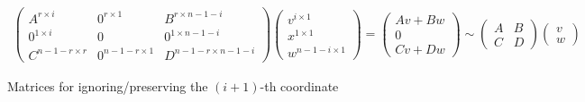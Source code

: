 \begin{figure}[h]
    \begin{align*}
        \left(\begin{matrix}
            A^{r     \times i} & 0^{r     \times 1} & B^{r     \times n-1-i} \\
            0^{1     \times i} & 0                  & 0^{1     \times n-1-i} \\
            C^{n-1-r \times r} & 0^{n-1-r \times 1} & D^{n-1-r \times n-1-i}         
        \end{matrix}\right)
        \left( \begin{matrix}
            v^{i     \times 1} \\
            x^{1     \times 1}\\
            w^{n-1-i \times 1}
        \end{matrix}\right)    = 
        \left( \begin{matrix}
            Av + Bw \\
            0\\
            Cv + Dw
        \end{matrix}\right)    \sim
        \left(\begin{matrix}
            A & B \\
            C & D
        \end{matrix}\right)
        \left(\begin{matrix}
            v \\
            w
        \end{matrix}\right)
    \end{align*}
    \caption{Matrices for ignoring/preserving the $(i+1)$-th coordinate}
\end{figure}





